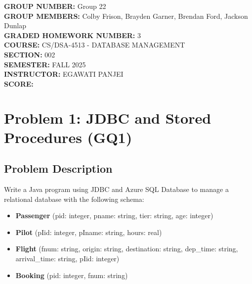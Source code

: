 \documentclass[12pt]{article}
\begin{document}
\begin{titlepage}
\thispagestyle{empty}
\centering
\vspace*{2cm}

\begin{flushleft}
{\Large \textbf{GROUP NUMBER:} Group 22}\\[0.5cm]
{\Large \textbf{GROUP MEMBERS:} Colby Frison, Brayden Garner, Brendan Ford, Jackson Dunlap}\\[0.5cm]
{\Large \textbf{GRADED HOMEWORK NUMBER:} 3}\\[0.5cm]
{\Large \textbf{COURSE:} CS/DSA-4513 - DATABASE MANAGEMENT}\\[0.5cm]
{\Large \textbf{SECTION:} 002}\\[0.5cm]
{\Large \textbf{SEMESTER:} FALL 2025}\\[0.5cm]
{\Large \textbf{INSTRUCTOR:} EGAWATI PANJEI}\\[0.5cm]
{\Large \textbf{SCORE:} }\\[2cm]
\end{flushleft}

\vfill

\end{titlepage}

\tableofcontents
\newpage

\section{Problem 1: JDBC and Stored Procedures (GQ1)}

\subsection{Problem Description}

Write a Java program using JDBC and Azure SQL Database to manage a relational database with the following schema:

\begin{itemize}
    \item \textbf{Passenger} (pid: integer, pname: string, tier: string, age: integer)
    \item \textbf{Pilot} (pIid: integer, pIname: string, hours: real)
    \item \textbf{Flight} (fnum: string, origin: string, destination: string, dep\_time: string, arrival\_time: string, pIid: integer)
    \item \textbf{Booking} (pid: integer, fnum: string)
\end{itemize}
\end{document}
